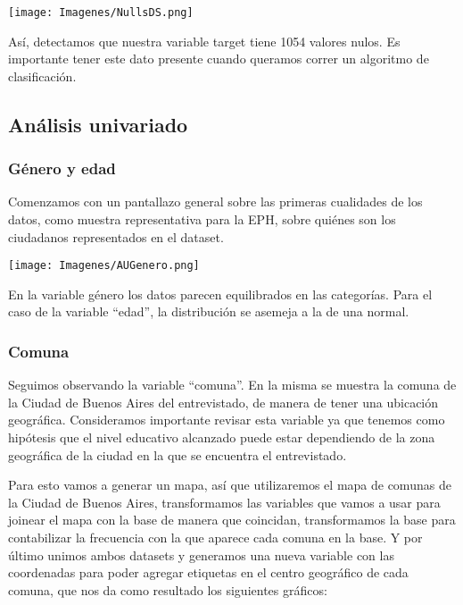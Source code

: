 \documentclass[a4paper]{article}
\begin{document}
    \begin{center}
        \texttt{[image: Imagenes/NullsDS.png]}
    \end{center}
 
    Así, detectamos que nuestra variable target tiene 1054 valores nulos. Es importante tener este dato presente cuando queramos correr un algoritmo de clasificación.

    \subsection{Análisis univariado}
 
        \subsubsection{Género y edad}
           
            Comenzamos con un pantallazo general sobre las primeras cualidades de los datos, como muestra representativa para la EPH, sobre quiénes son los ciudadanos representados en el dataset.
           
            \begin{center}
                \texttt{[image: Imagenes/AUGenero.png]}    
            \end{center}
           
 
            En la variable género los datos parecen equilibrados en las categorías. Para el caso de la variable ``edad'', la distribución se asemeja a la de una normal.
           
            \subsubsection{Comuna}
           
            Seguimos observando la variable ``comuna''. En la misma se muestra la comuna de la Ciudad de Buenos Aires del entrevistado, de manera de tener una ubicación geográfica. Consideramos importante revisar esta variable ya que tenemos como hipótesis que el nivel educativo alcanzado puede estar dependiendo de la zona geográfica de la ciudad en la que se encuentra el entrevistado.
           
            Para esto vamos a generar un mapa, así que utilizaremos el mapa de comunas de la Ciudad de Buenos Aires, transformamos las variables que vamos a usar para joinear el mapa con la base de manera que coincidan, transformamos la base para contabilizar la frecuencia con la que aparece cada comuna en la base. Y por último unimos ambos datasets y generamos una nueva variable con las coordenadas para poder agregar etiquetas en el centro geográfico de cada comuna, que nos da como resultado los siguientes gráficos:
           
\end{document}
